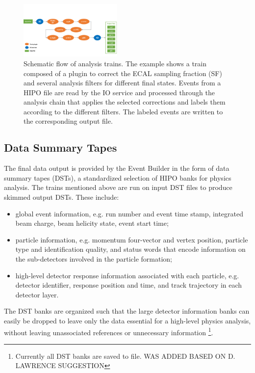 \begin{figure}
    \includegraphics[width=0.45\textwidth,height=0.2\textheight]{pics/train.pdf}
    \caption{Schematic flow of analysis trains. The example shows a train composed of a plugin to correct the ECAL
      sampling fraction (SF) and several analysis filters for different final states. Events from a HIPO file are read
      by the IO service and processed through the analysis chain that applies the selected corrections and labels them
      according to the different filters. The labeled events are written to the corresponding output file.\label{fig:train}}
\end{figure}

\subsection{Data Summary Tapes}
\label{sec:dsts}

The final data output is provided by the Event Builder in the form of data summary tapes (DSTs), a standardized
selection of HIPO banks for physics analysis. The trains mentioned above are run on input DST files to produce
skimmed output DSTs. These include:

\begin{itemize}
\item global event information, e.g. run number and event time stamp, integrated beam charge, beam helicity state,
  event start time;
\item particle information, e.g. momentum four-vector and vertex position, particle type and identification quality,
  and status words that encode information on the sub-detectors involved in the particle formation;
\item high-level detector response information associated with each particle, e.g. detector identifier, response
  position and time, and track trajectory in each detector layer.
\end{itemize}

\noindent
The DST banks are organized such that the large detector information banks can easily be dropped to leave only
the data essential for a high-level physics analysis, without leaving unassociated references or unnecessary information
\footnote{{\color{red} Currently all DST banks are saved to file. WAS ADDED BASED ON D. LAWRENCE SUGGESTION}}. 

